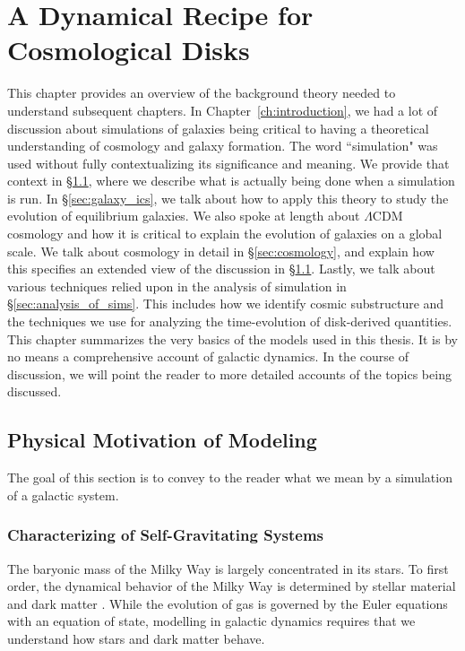 \chapter{A Dynamical Recipe for Cosmological Disks}\label{ch:background}

This chapter provides an overview of the background theory needed to understand subsequent chapters. In Chapter~\ref{ch:introduction}, we had a lot of discussion about simulations of galaxies being critical to having a theoretical understanding of cosmology and galaxy formation. The word ``simulation" was used without fully contextualizing its significance and meaning. We provide that context in \S\ref{sec:motivation}, where we describe what is actually being done when a simulation is run. In \S\ref{sec:galaxy_ics}, we talk about how to apply this theory to study the evolution of equilibrium galaxies. We also spoke at length about $\Lambda$CDM cosmology and how it is critical to explain the evolution of galaxies on a global scale. We talk about cosmology in detail in \S\ref{sec:cosmology}, and explain how this specifies an extended view of the discussion in \S\ref{sec:motivation}. Lastly, we talk about various techniques relied upon in the analysis of simulation in \S\ref{sec:analysis_of_sims}. This includes how we identify cosmic substructure and the techniques we use for analyzing the time-evolution of disk-derived quantities. This chapter summarizes the very basics of the models used in this thesis. It is by no means a comprehensive account of galactic dynamics. In the course of discussion, we will point the reader to more detailed accounts of the topics being discussed.

\section{Physical Motivation of Modeling} \label{sec:motivation}

The goal of this section is to convey to the reader what we mean by a simulation of a galactic system. 

\subsection{Characterizing of Self-Gravitating Systems}

The baryonic mass of the Milky Way is largely concentrated in its stars. To first order, the dynamical behavior of the Milky Way is determined by stellar material and dark matter \citep{BM}. While the evolution of gas is governed by the Euler equations with an equation of state, modelling in galactic dynamics requires that we understand how stars and dark matter behave. 

